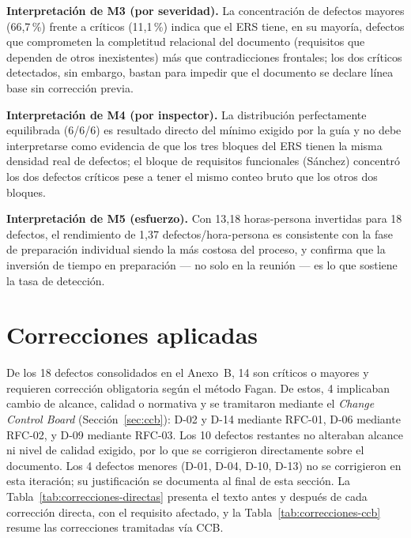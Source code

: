 \documentclass[journal,onecolumn]{IEEEtran}
\begin{document}
	\textbf{Interpretación de M3 (por severidad).} La concentración de
	defectos mayores (66,7\,\%) frente a críticos (11,1\,\%) indica que
	el ERS tiene, en su mayoría, defectos que comprometen la
	completitud relacional del documento (requisitos que dependen de
	otros inexistentes) más que contradicciones frontales; los dos
	críticos detectados, sin embargo, bastan para impedir que el
	documento se declare línea base sin corrección previa.
	
	\textbf{Interpretación de M4 (por inspector).} La distribución
	perfectamente equilibrada (6/6/6) es resultado directo del mínimo
	exigido por la guía y no debe interpretarse como evidencia de que
	los tres bloques del ERS tienen la misma densidad real de
	defectos; el bloque de requisitos funcionales (Sánchez) concentró
	los dos defectos críticos pese a tener el mismo conteo bruto que
	los otros dos bloques.
	
	\textbf{Interpretación de M5 (esfuerzo).} Con 13,18 horas-persona
	invertidas para 18 defectos, el rendimiento de 1,37
	defectos/hora-persona es consistente con la fase de preparación
	individual siendo la más costosa del proceso, y confirma que la
	inversión de tiempo en preparación --- no solo en la reunión ---
	es lo que sostiene la tasa de detección.
	
	\section{Correcciones aplicadas}
	\label{sec:correcciones}
	
	De los 18 defectos consolidados en el Anexo~B, 14 son críticos o
	mayores y requieren corrección obligatoria según el método Fagan.
	De estos, 4 implicaban cambio de alcance, calidad o normativa y se
	tramitaron mediante el \emph{Change Control Board}
	(Sección~\ref{sec:ccb}): D-02 y D-14 mediante RFC-01, D-06
	mediante RFC-02, y D-09 mediante RFC-03. Los 10 defectos restantes
	no alteraban alcance ni nivel de calidad exigido, por lo que se
	corrigieron directamente sobre el documento. Los 4 defectos
	menores (D-01, D-04, D-10, D-13) no se corrigieron en esta
	iteración; su justificación se documenta al final de esta sección.
	La Tabla~\ref{tab:correcciones-directas} presenta el texto antes y
	después de cada corrección directa, con el requisito afectado, y
	la Tabla~\ref{tab:correcciones-ccb} resume las correcciones
	tramitadas vía CCB.
	
\end{document}
